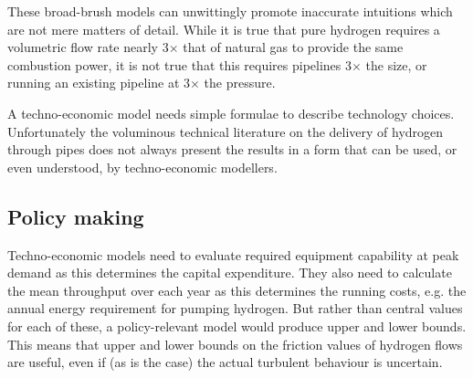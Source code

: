 \documentclass[5p]{elsarticle} %
\begin{document}
These broad-brush models can unwittingly promote inaccurate intuitions which are not mere matters of detail. While it is true that pure hydrogen requires a volumetric flow rate nearly 3$\times$  that of natural gas to provide the same combustion power, it is not true that this requires pipelines 3$\times$  the size, or running an existing pipeline at 3$\times$  the pressure.

A techno-economic model needs simple formulae to describe technology choices. Unfortunately the voluminous technical literature on the delivery of hydrogen through pipes does not always present the results in a form that can be used, or even understood, by techno-economic modellers. 

\subsection{Policy making}
Techno-economic models need to evaluate required equipment capability at peak demand as this determines the capital expenditure. They also need to calculate the mean throughput over each year as this determines the running costs, e.g. the annual energy requirement for pumping hydrogen. But rather than central values for each of these, a policy-relevant model would produce upper and lower bounds. This means that upper and lower bounds on the friction values of hydrogen flows are useful, even if (as is the case) the actual turbulent behaviour is uncertain.
\end{document}
